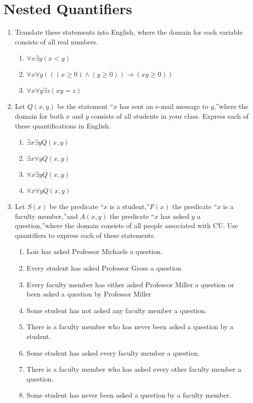 \documentclass{sig-alternate-05-2015}
\begin{document}
\section{Nested Quantifiers}

\begin{enumerate}
\item Translate these statements into English, where the domain
for each variable consists of all real numbers.
\begin{enumerate}
	\item $\forall x \exists y (x < y)$
	\item $\forall x \forall y (((x \ge 0) \wedge (y \ge 0)) \rightarrow (x y \ge 0))$
	\item $\forall x \forall y \exists z (x y = z)$
\end{enumerate}

\item Let $Q(x, y)$ be the statement \textquotedblleft $x$ has sent an e-mail message
to $y$,\textquotedblright where the domain for both $x$ and $y$ consists of
all students in your class. Express each of these quantifications in English.
\begin{enumerate}
	\item $\exists x \exists y Q(x, y)$
	\item $\exists x \forall y Q(x, y)$
	\item $\forall x \exists y Q(x, y)$
	\item $\forall x \forall y Q(x, y)$
\end{enumerate}

\item Let $S(x)$ be the predicate \textquotedblleft $x$ is a student,\textquotedblright $F(x)$ the predicate
\textquotedblleft $x$ is a faculty member,\textquotedblright and $A(x, y)$ the predicate
\textquotedblleft $x$ has asked $y$ a question,\textquotedblright where the domain consists of
all people associated with CU. Use quantifiers to
express each of these statements.
\begin{enumerate}
	\item Lois has asked Professor Michaels a question.
	\item Every student has asked Professor Gross a question
	\item Every faculty member has either asked Professor
	Miller a question or been asked a question by Professor
	Miller
	\item Some student has not asked any faculty member a
	question.
	\item There is a faculty member who has never been asked
	a question by a student.
	\item Some student has asked every faculty member a question.
	\item There is a faculty member who has asked every other
	faculty member a question.
	\item Some student has never been asked a question by a
	faculty member.
\end{enumerate}
	

\end{enumerate}
\end{document}
